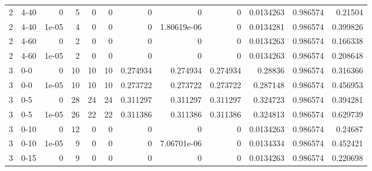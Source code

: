 \begin{tabular}{rlrrrrrrrrrr}
     2 & 4-40   &      0     &           5 &                 0 &                 0 &     0           &     0           &      0           &        0.0134263 &               0.986574 &           0.21504  \\
     2 & 4-40   &      1e-05 &           4 &                 0 &                 0 &     0           &     1.80619e-06 &      0           &        0.0134281 &               0.986574 &           0.399826 \\
     2 & 4-60   &      0     &           2 &                 0 &                 0 &     0           &     0           &      0           &        0.0134263 &               0.986574 &           0.166338 \\
     2 & 4-60   &      1e-05 &           2 &                 0 &                 0 &     0           &     0           &      0           &        0.0134263 &               0.986574 &           0.208648 \\
     3 & 0-0    &      0     &          10 &                10 &                10 &     0.274934    &     0.274934    &      0.274934    &        0.28836   &               0.986574 &           0.316366 \\
     3 & 0-0    &      1e-05 &          10 &                10 &                10 &     0.273722    &     0.273722    &      0.273722    &        0.287148  &               0.986574 &           0.456953 \\
     3 & 0-5    &      0     &          28 &                24 &                24 &     0.311297    &     0.311297    &      0.311297    &        0.324723  &               0.986574 &           0.394281 \\
     3 & 0-5    &      1e-05 &          26 &                22 &                22 &     0.311386    &     0.311386    &      0.311386    &        0.324813  &               0.986574 &           0.629739 \\
     3 & 0-10   &      0     &          12 &                 0 &                 0 &     0           &     0           &      0           &        0.0134263 &               0.986574 &           0.24687  \\
     3 & 0-10   &      1e-05 &           9 &                 0 &                 0 &     0           &     7.06701e-06 &      0           &        0.0134334 &               0.986574 &           0.452421 \\
     3 & 0-15   &      0     &           9 &                 0 &                 0 &     0           &     0           &      0           &        0.0134263 &               0.986574 &           0.220698 \\

\end{tabular}
